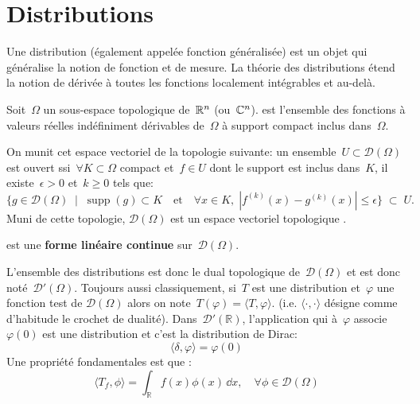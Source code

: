 \medskip
\section{Distributions}
Une distribution (également appelée fonction généralisée) est un objet qui généralise
la notion de fonction et de mesure.
La théorie des distributions étend la notion de dérivée à toutes les fonctions localement
intégrables et au-delà.

\medskip
\begin{definition}
Soit~$\Omega$ un sous-espace topologique de~$\mathbb R^n$ (ou~$\mathbb C^n$).
 est l'ensemble des fonctions
à valeurs réelles indéfiniment dérivables de~$\Omega$ à support compact inclus dans~$\Omega$.

On munit cet espace vectoriel de la topologie suivante: un ensemble~$U \subset \mathcal{D}(\Omega)$ est
ouvert ssi~$\forall K \subset \Omega$ compact et~$f \in U$ dont le support est inclus dans~$K$,
il existe~$\epsilon > 0$ et~$k \ge 0$ tels que:
\begin{equation}
  \{ g \in \mathcal{D}(\Omega)\;\mid\; \operatorname{supp}(g) \subset K\quad\text{et}\quad\forall x \in K,\; |f^{(k)}(x)-g^{(k)}(x)|\le \epsilon \}\;\subset\;U.
\end{equation}
Muni de cette topologie, $\mathcal{D}(\Omega)$ est un espace vectoriel topologique .
\end{definition}

\medskip
\begin{definition}[Distribution]
 est une \textbf{forme linéaire continue}
sur~$\mathcal{D}(\Omega)$.
\end{definition}

L'ensemble des distributions est donc le dual topologique de~$\mathcal{D}(\Omega)$ et est donc noté~$\mathcal{D}'(\Omega)$.
\medskipvm
Toujours aussi classiquement, si~$T$ est une distribution et~$\varphi$ une fonction test de
$\mathcal{D}(\Omega)$ alors on note~$T(\varphi)=\langle T,\varphi \rangle$. (i.e.
$\langle\cdot,\cdot\rangle$ désigne comme d'habitude le crochet de dualité).
\medskipvm
Dans~$\mathcal{D}'(\mathbb{R})$, l'application qui à~$\varphi$ associe~$\varphi(0)$ est une distribution et c'est la distribution de Dirac:
\begin{equation}
\langle\delta,\varphi\rangle=\varphi(0)
\end{equation}
\medskipvm
Une propriété fondamentales est que :
\begin{equation}
  \langle T_f,\phi\rangle=\int_{\mathbb{R}}f(x)\phi(x)\,\dd x, \quad \forall \phi\in\mathcal{D}(\Omega)
\end{equation}


